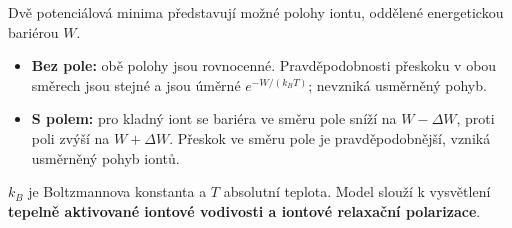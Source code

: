 Dvě potenciálová minima představují možné polohy iontu, oddělené energetickou bariérou $W$.
\begin{itemize}
\item \textbf{Bez pole:} obě polohy jsou rovnocenné. Pravděpodobnosti přeskoku v obou směrech jsou stejné a jsou úměrné $e^{-W/(k_BT)}$; nevzniká usměrněný pohyb.
\item \textbf{S polem:} pro kladný iont se bariéra ve směru pole sníží na $W-\Delta W$, proti poli zvýší na $W+\Delta W$. Přeskok ve směru pole je pravděpodobnější, vzniká usměrněný pohyb iontů.
\end{itemize}
$k_B$ je Boltzmannova konstanta a $T$ absolutní teplota. Model slouží k vysvětlení \textbf{tepelně aktivované iontové vodivosti a iontové relaxační polarizace}.
